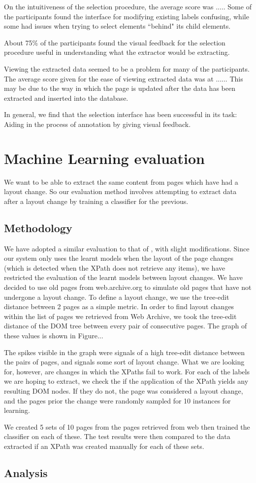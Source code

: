 On the intuitiveness of the selection procedure, the average score was .....
Some of the participants found the interface for modifying existing labels confusing,
while some had issues when trying to select elements ``behind" its child elements.

About 75\% of the participants found the visual feedback for the selection procedure useful
in understanding what the extractor would be extracting. 

Viewing the extracted data seemed to be a problem for many of the participants. The average
score given for the ease of viewing extracted data was at ...... This may be due to the way
in which the page is updated after the data has been extracted and inserted into the database.

In general, we find that the selection interface has been successful in its task: Aiding in 
the process of annotation by giving visual feedback.

\section{Machine Learning evaluation}
 We want to be able to extract the same content from pages which have had a layout change. So our
 evaluation method involves attempting to extract data after a layout change by training a
 classifier for the previous.
\subsection{Methodology}
 We have adopted a similar evaluation to that of \cite{Dalvi2009}, with slight modifications.
 Since our system only uses the learnt models when the layout of the page changes (which is 
 detected when the XPath does not retrieve any items), we have restricted the evaluation of 
 the learnt models between layout changes.
	 We have decided to use old pages from web.archive.org to simulate old pages that have not
 undergone a layout change. To define a layout change, we use the tree-edit distance \cite{Zhang1989} between 2 pages as
a simple metric. In order to find layout changes within the list of pages we retrieved from Web
Archive, we took the tree-edit distance of the DOM tree between every pair of consecutive pages.
The graph of these values is shown in Figure...%

	The spikes visible in the graph were signals of a high tree-edit distance between the pairs
of pages, and signals some sort of layout change. What we are looking for, however, are changes
in which the XPaths fail to work. For each of the labels we are hoping to extract, we check the
if the application of the XPath yields any resulting DOM nodes. If they do not, the page was
considered a layout change, and the pages prior the change were randomly sampled for 10 instances
for learning.

	 We created 5 sets of 10 pages from the pages retrieved from web
 then trained the classifier on each of these. The test results were then compared to the data
 extracted if an XPath was created manually for each of these sets.
 
 
\subsection{Analysis} 